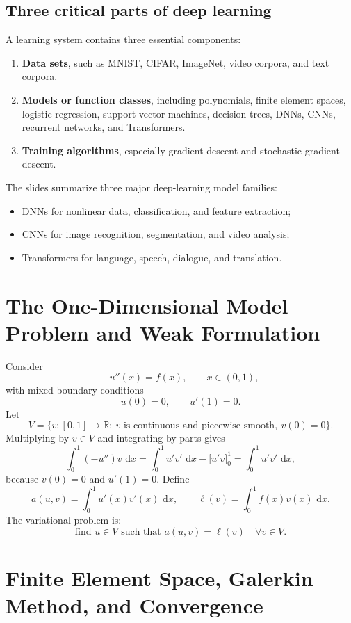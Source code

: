 \documentclass[11pt,a4paper]{article}
\newcommand{\R}{\mathbb{R}}
\newcommand{\dd}{\,\mathrm{d}}
\theoremstyle{definition}
\theoremstyle{plain}
\theoremstyle{remark}
\begin{document}
\subsection{Three critical parts of deep learning}
A learning system contains three essential components:
\begin{enumerate}
  \item \textbf{Data sets}, such as MNIST, CIFAR, ImageNet, video corpora, and text corpora.
  \item \textbf{Models or function classes}, including polynomials, finite element spaces, logistic regression, support vector machines, decision trees, DNNs, CNNs, recurrent networks, and Transformers.
  \item \textbf{Training algorithms}, especially gradient descent and stochastic gradient descent.
\end{enumerate}

The slides summarize three major deep-learning model families:
\begin{itemize}
  \item DNNs for nonlinear data, classification, and feature extraction;
  \item CNNs for image recognition, segmentation, and video analysis;
  \item Transformers for language, speech, dialogue, and translation.
\end{itemize}

\section{The One-Dimensional Model Problem and Weak Formulation}

Consider
\[
  -u''(x)=f(x),\qquad x\in(0,1),
\]
with mixed boundary conditions
\[
  u(0)=0,\qquad u'(1)=0.
\]
Let
\[
  V=\{v:[0,1]\to\R:\ v\text{ is continuous and piecewise smooth},\ v(0)=0\}.
\]
Multiplying by $v\in V$ and integrating by parts gives
\[
  \int_0^1(-u'')v\,\dd x
  =\int_0^1u'v'\,\dd x-\bigl[u'v\bigr]_0^1
  =\int_0^1u'v'\,\dd x,
\]
because $v(0)=0$ and $u'(1)=0$. Define
\[
  a(u,v)=\int_0^1u'(x)v'(x)\,\dd x,
  \qquad
  \ell(v)=\int_0^1f(x)v(x)\,\dd x.
\]
The variational problem is:
\[
  \text{find }u\in V\text{ such that }a(u,v)=\ell(v)\quad\forall v\in V.
\]

\section{Finite Element Space, Galerkin Method, and Convergence}
\end{document}
